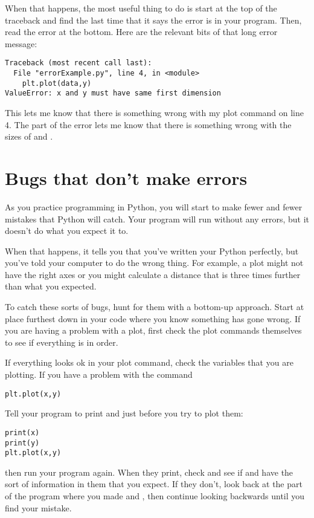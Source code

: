 When that happens, the most useful thing to do is start at the top of the traceback and find the last time that it says the error is in your program.  Then, read the error at the bottom.  Here are the relevant bits of that long error message:

\begin{Verbatim}
Traceback (most recent call last):
  File "errorExample.py", line 4, in <module>
    plt.plot(data,y)
ValueError: x and y must have same first dimension
\end{Verbatim}
This lets me know that there is something wrong with my plot command on line 4. The  part of the error lets me know that there is something wrong with the sizes of  and .

\section{Bugs that don't make errors}
As you practice programming in Python, you will start to make fewer and fewer mistakes that Python will catch.  Your program will run without any errors, but it doesn't do what you expect it to.

When that happens, it tells you that you've written your Python perfectly, but you've told your computer to do the wrong thing.  For example, a plot might not have the right axes or
you might calculate a distance that is three times further than what you expected.

To catch these sorts of bugs, hunt for them with a bottom-up approach.  Start at place furthest down in your code where you know something has gone wrong.  If you are having a problem with a plot, first check the plot commands themselves to see if everything is in order.

If everything looks ok in your plot command, check the variables that you are plotting.  If you have a problem with the command
\begin{Verbatim}
plt.plot(x,y)
\end{Verbatim}

Tell your program to print  and  just before you try to plot them:
\begin{Verbatim}
print(x)
print(y)
plt.plot(x,y)

\end{Verbatim}
then run your program again. When they print, check and see if  and  have the sort of information in them that you expect.  If they don't, look back at the part of the program where you made  and , then continue looking backwards until you find your mistake.

